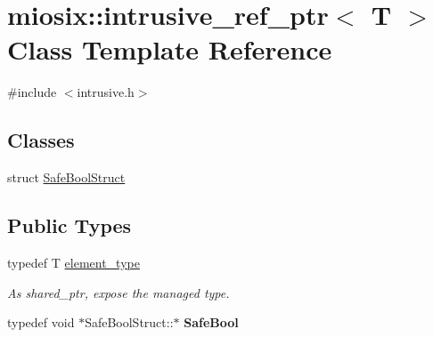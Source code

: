 \hypertarget{classmiosix_1_1intrusive__ref__ptr}{\section{miosix\-:\-:intrusive\-\_\-ref\-\_\-ptr$<$ T $>$ Class Template Reference}
\label{classmiosix_1_1intrusive__ref__ptr}
}


{\ttfamily \#include $<$intrusive.\-h$>$}

\subsection*{Classes}
\begin{DoxyCompactItemize}
\item 
struct \hyperlink{structmiosix_1_1intrusive__ref__ptr_1_1_safe_bool_struct}{Safe\-Bool\-Struct}
\end{DoxyCompactItemize}
\subsection*{Public Types}
\begin{DoxyCompactItemize}
\item 
\hypertarget{classmiosix_1_1intrusive__ref__ptr_a77db2e55c011e31533b8b637e45a4bf5}{typedef T \hyperlink{classmiosix_1_1intrusive__ref__ptr_a77db2e55c011e31533b8b637e45a4bf5}{element\-\_\-type}}\label{classmiosix_1_1intrusive__ref__ptr_a77db2e55c011e31533b8b637e45a4bf5}

\begin{DoxyCompactList}\small\item\em As shared\-\_\-ptr, expose the managed type. \end{DoxyCompactList}\item 
\hypertarget{classmiosix_1_1intrusive__ref__ptr_aab447eb87c4ffc44a2a84688954de282}{typedef void $\ast$Safe\-Bool\-Struct\-::$\ast$ {\bfseries Safe\-Bool}}\label{classmiosix_1_1intrusive__ref__ptr_aab447eb87c4ffc44a2a84688954de282}

\end{DoxyCompactItemize}
